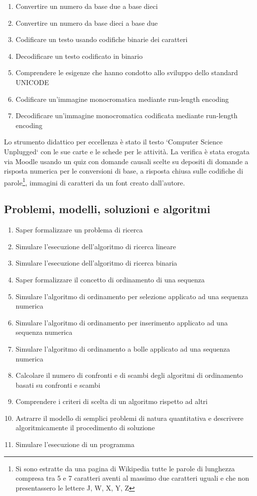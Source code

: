 \documentclass{easychair}
\begin{document}
\begin{enumerate}
  \item
    Convertire un numero da base due a base dieci
  \item
    Convertire un numero da base dieci a base due
  \item
    Codificare un testo usando codifiche binarie dei caratteri
  \item
    Decodificare un testo codificato in binario
  \item
    Comprendere le esigenze che hanno condotto allo sviluppo dello
    standard UNICODE
  \item
    Codificare un'immagine monocromatica mediante run-length encoding
  \item
    Decodificare un'immagine monocromatica codificata mediante run-length
    encoding
\end{enumerate}  

Lo strumento didattico per eccellenza è stato il testo
`Computer Science Unplugged` con le sue carte e le schede per le attività.
La verifica è stata erogata via Moodle usando un quiz con domande causali
scelte su depositi di domande a risposta numerica per le conversioni di base,
a risposta chiusa sulle codifiche di parole\footnote{Si sono estratte
da una pagina di Wikipedia
tutte le parole di lunghezza compresa tra 5 e 7 caratteri aventi al massimo
due caratteri uguali e che non presentassero le lettere J, W, X, Y, Z},
immagini di caratteri da un font creato dall'autore.

\subsection[Problemi e algoritmi]{Problemi, modelli, soluzioni e algoritmi}


\begin{enumerate}
  \item
    Saper formalizzare un problema di ricerca
  \item
    Simulare l'esecuzione dell'algoritmo di ricerca lineare
  \item
    Simulare l'esecuzione dell'algoritmo di ricerca binaria
  \item
    Saper formalizzare il concetto di ordinamento di una sequenza
  \item
    Simulare l'algoritmo di ordinamento per selezione applicato ad una
    sequenza numerica
  \item
    Simulare l'algoritmo di ordinamento per inserimento applicato ad una
    sequenza numerica
  \item
    Simulare l'algoritmo di ordinamento a bolle applicato ad una sequenza
    numerica
  \item
    Calcolare il numero di confronti e di scambi degli algoritmi di
    ordinamento basati su confronti e scambi
  \item
    Comprendere i criteri di scelta di un algoritmo rispetto ad altri
  \item
    Astrarre il modello di semplici problemi di natura quantitativa e
    descrivere algoritmicamente il procedimento di soluzione
  \item
    Simulare l'esecuzione di un programma
\end{enumerate}
  
\end{document}
